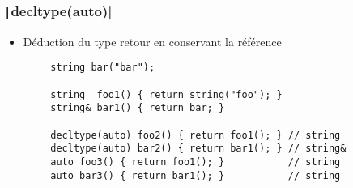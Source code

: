 \documentclass[C++.tex]{subfiles}
\begin{document}
\begin{frame}[fragile]
	\frametitle{\texttt|decltype(auto)|}
	\begin{itemize}
		\item Déduction du type retour en conservant la référence
	\end{itemize}

	\begin{verbatim}
		string bar("bar");

		string  foo1() { return string("foo"); }
		string& bar1() { return bar; }

		decltype(auto) foo2() { return foo1(); } // string
		decltype(auto) bar2() { return bar1(); } // string&
		auto foo3() { return foo1(); }           // string
		auto bar3() { return bar1(); }           // string
	\end{verbatim}

\end{frame}
\end{document}
